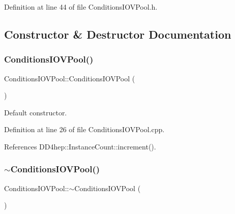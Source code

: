 Definition at line 44 of file Conditions\+I\+O\+V\+Pool.\+h.



\subsection{Constructor \& Destructor Documentation}
\hypertarget{class_d_d4hep_1_1_conditions_1_1_conditions_i_o_v_pool_a8ccf22020bacb07028aea997d172c7d0}{}\label{class_d_d4hep_1_1_conditions_1_1_conditions_i_o_v_pool_a8ccf22020bacb07028aea997d172c7d0} 
\subsubsection{\texorpdfstring{Conditions\+I\+O\+V\+Pool()}{ConditionsIOVPool()}}
{\footnotesize\ttfamily Conditions\+I\+O\+V\+Pool\+::\+Conditions\+I\+O\+V\+Pool (\begin{DoxyParamCaption}{ }\end{DoxyParamCaption})}



Default constructor. 



Definition at line 26 of file Conditions\+I\+O\+V\+Pool.\+cpp.



References D\+D4hep\+::\+Instance\+Count\+::increment().

\hypertarget{class_d_d4hep_1_1_conditions_1_1_conditions_i_o_v_pool_a58a9a1f3f6d282fa24c00010193da303}{}\label{class_d_d4hep_1_1_conditions_1_1_conditions_i_o_v_pool_a58a9a1f3f6d282fa24c00010193da303} 
\subsubsection{\texorpdfstring{$\sim$\+Conditions\+I\+O\+V\+Pool()}{~ConditionsIOVPool()}}
{\footnotesize\ttfamily Conditions\+I\+O\+V\+Pool\+::$\sim$\+Conditions\+I\+O\+V\+Pool (\begin{DoxyParamCaption}{ }\end{DoxyParamCaption})\hspace{0.3cm}{\ttfamily [virtual]}}



